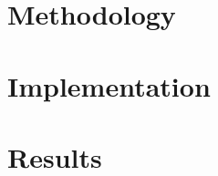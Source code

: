 \documentclass[12pt]{llncs}
\begin{document}
%


\restoregeometry

%
%
%
\tableofcontents

\clearpage

%
%
\section{Methodology}


\clearpage

%
%
\section{Implementation}


\clearpage

%
%
\section{Results}


\clearpage

%
%


\clearpage

%
%
%
%

 \label{references}
%
\end{document}
